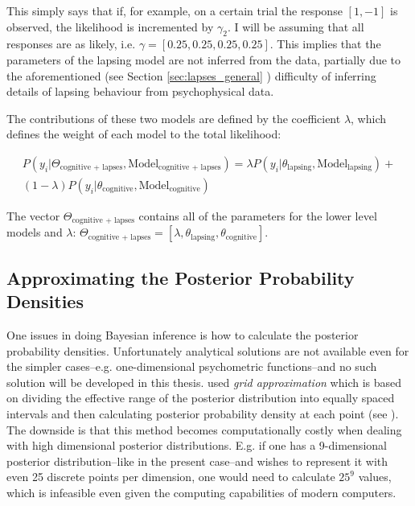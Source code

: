 \documentclass{article}\usepackage{knitr}
\begin{document}
This simply says that if, for example, on a certain trial the response $[1,-1]$ is observed, the likelihood is incremented by $\gamma_2$. I will be assuming that all responses are as likely, i.e. $\gamma = [0.25, 0.25, 0.25, 0.25]$. This implies that the parameters of the lapsing model are not inferred from the data, partially due to the aforementioned (see Section \ref{sec:lapses_general} \textit{}) difficulty of inferring details of lapsing behaviour from psychophysical data. 

The contributions of these two models are defined by the coefficient $\lambda$, which defines the weight of each model to the total likelihood:

\begin{multline}
\label{eq:lower_level_hiera}
P(y_i |\Theta_{\text{cognitive + lapses}}, \text{Model}_{\text{cognitive + lapses}}) = \lambda P(y_i | \theta_{\text{lapsing}}, \text{Model}_{\text{lapsing}}) + \\ (1 - \lambda) P(y_i | \theta_{\text{cognitive}}, \text{Model}_{\text{cognitive}})
\end{multline}

The vector $\Theta_{\text{cognitive + lapses}}$ contains all of the parameters for the lower level models and $\lambda$: $\Theta_{\text{cognitive + lapses}} = [\lambda, \theta_{\text{lapsing}}, \theta_{\text{cognitive}}]$.

\subsection{Approximating the Posterior Probability Densities}
\label{sec:posterior_approx}

One issues in doing Bayesian inference is how to calculate the posterior probability densities. Unfortunately analytical solutions are not available even for the simpler cases--e.g. one-dimensional psychometric functions--and no such solution will be developed in this thesis. \citet{kontsevichtyler1999} used \textit{grid approximation} which is based on dividing the effective range of the posterior distribution into equally spaced intervals and then calculating posterior probability density at each point (see \citealt[p.144]{kruschke2015}). The downside is that this method becomes computationally costly when dealing with high dimensional posterior distributions. E.g. if one has a 9-dimensional posterior distribution--like in the present case--and wishes to represent it with even 25 discrete points per dimension, one would need to calculate $25^9$ values, which is infeasible even given the computing capabilities of modern computers.
\end{document}
